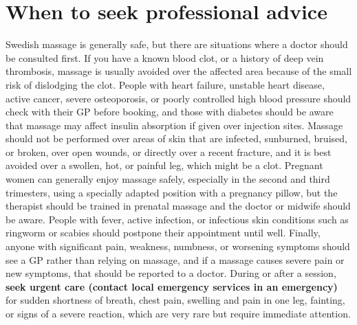 \section*{When to seek professional advice}
Swedish massage is generally safe, but there are situations where a doctor should be consulted first. If you have a known blood clot, or a history of deep vein thrombosis, massage is usually avoided over the affected area because of the small risk of dislodging the clot. People with heart failure, unstable heart disease, active cancer, severe osteoporosis, or poorly controlled high blood pressure should check with their GP before booking, and those with diabetes should be aware that massage may affect insulin absorption if given over injection sites. Massage should not be performed over areas of skin that are infected, sunburned, bruised, or broken, over open wounds, or directly over a recent fracture, and it is best avoided over a swollen, hot, or painful leg, which might be a clot. Pregnant women can generally enjoy massage safely, especially in the second and third trimesters, using a specially adapted position with a pregnancy pillow, but the therapist should be trained in prenatal massage and the doctor or midwife should be aware. People with fever, active infection, or infectious skin conditions such as ringworm or scabies should postpone their appointment until well. Finally, anyone with significant pain, weakness, numbness, or worsening symptoms should see a GP rather than relying on massage, and if a massage causes severe pain or new symptoms, that should be reported to a doctor. During or after a session, \textbf{seek urgent care (contact local emergency services in an emergency)} for sudden shortness of breath, chest pain, swelling and pain in one leg, fainting, or signs of a severe reaction, which are very rare but require immediate attention.

